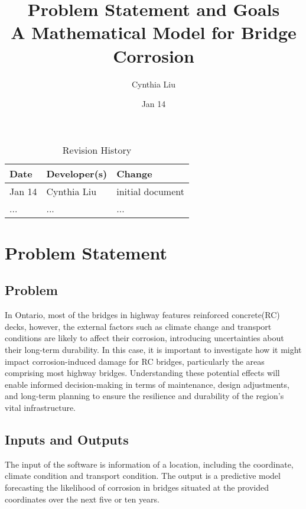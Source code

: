 \documentclass{article}
\title{Problem Statement and Goals\\A Mathematical Model for Bridge Corrosion}
\author{Cynthia Liu}
\date{Jan 14}
\begin{document}
\maketitle

\begin{table}[hp]
\caption{Revision History} \label{TblRevisionHistory}
\begin{tabularx}{\textwidth}{llX}
\toprule
\textbf{Date} & \textbf{Developer(s)} & \textbf{Change}\\
\midrule
Jan 14 & Cynthia Liu & initial document\\
... & ... & ...\\
\bottomrule
\end{tabularx}
\end{table}

\section{Problem Statement}

\subsection{Problem}
In Ontario, most of the bridges in highway features reinforced concrete(RC) decks, however, the external factors such as climate change and transport conditions are likely to affect their corrosion, introducing uncertainties about their long-term durability. In this case, it is important to investigate how it might impact corrosion-induced damage for RC bridges, particularly the areas comprising most highway bridges. Understanding these potential effects will enable informed decision-making in terms of maintenance, design adjustments, and long-term planning to ensure the resilience and durability of the region's vital infrastructure.

\subsection{Inputs and Outputs}
The input of the software is information of a location, including the coordinate, climate condition and transport condition. The output is a predictive model forecasting the likelihood of corrosion in bridges situated at the provided coordinates over the next five or ten years.
\end{document}
